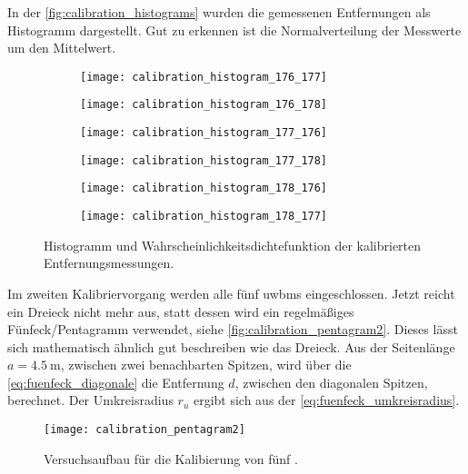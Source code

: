 In der \autoref{fig:calibration_histograms} wurden die gemessenen Entfernungen als Histogramm dargestellt. Gut zu erkennen ist die Normalverteilung der Messwerte um den Mittelwert.

\begin{figure}[h]
	\centering
	\begin{subfigure}[b]{0.32\linewidth}
		\centering
		\texttt{[image: calibration\_histogram\_176\_177]}
	\end{subfigure}
	\hfill
	\begin{subfigure}[b]{0.32\linewidth}
		\centering
		\texttt{[image: calibration\_histogram\_176\_178]}
	\end{subfigure}
	\hfill
	\begin{subfigure}[b]{0.32\linewidth}
		\centering
		\texttt{[image: calibration\_histogram\_177\_176]}
	\end{subfigure}
	\par
	\bigskip
	\begin{subfigure}[b]{0.32\linewidth}
		\centering
		\texttt{[image: calibration\_histogram\_177\_178]}
	\end{subfigure}
	\hfill
	\begin{subfigure}[b]{0.32\linewidth}
		\centering
		\texttt{[image: calibration\_histogram\_178\_176]}
	\end{subfigure}
	\hfill
	\begin{subfigure}[b]{0.32\linewidth}
		\centering
		\texttt{[image: calibration\_histogram\_178\_177]}
	\end{subfigure}
	\caption{Histogramm und Wahrscheinlichkeitsdichtefunktion der kalibrierten Entfernungsmessungen.}
	\label{fig:calibration_histograms}
\end{figure}

Im zweiten Kalibriervorgang werden alle fünf \Glspl{uwbm} eingeschlossen. Jetzt reicht ein Dreieck nicht mehr aus, statt dessen wird ein regelmäßiges Fünfeck/Pentagramm verwendet, siehe \autoref{fig:calibration_pentagram2}. Dieses lässt sich mathematisch ähnlich gut beschreiben wie das Dreieck. Aus der Seitenlänge $a = \SI{4.5}{\meter}$, zwischen zwei benachbarten Spitzen, wird über die \autoref{eq:fuenfeck_diagonale} die Entfernung $d$, zwischen den diagonalen Spitzen, berechnet. Der Umkreisradius $r_u$ ergibt sich aus der \autoref{eq:fuenfeck_umkreisradius}.

\begin{figure}[h]
	\centering
	\texttt{[image: calibration\_pentagram2]}
	\caption{Versuchsaufbau für die Kalibierung von fünf .}
	\label{fig:calibration_pentagram2}
\end{figure}

